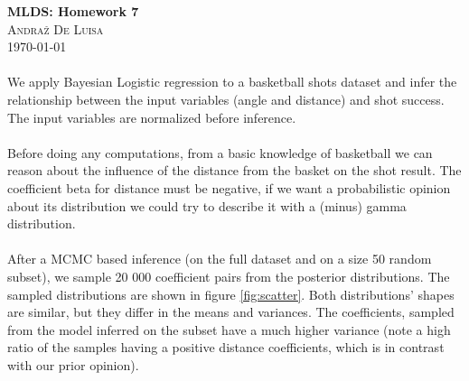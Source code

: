 \documentclass[twocolumn]{article}
\begin{document}
\begin{center}

\Large{\textbf{MLDS: Homework 7}} \\
\textsc{\large{Andraž De Luisa}} \\
\vspace{6pt}
\small{\today}

\end{center}

\paragraph{} We apply Bayesian Logistic regression to a basketball shots dataset and infer the relationship between the input variables (angle and distance) and shot success. The input variables are normalized before inference.

\paragraph{} Before doing any computations, from a basic knowledge of basketball we can reason about the influence of the distance from the basket on the shot result. The coefficient beta for distance must be negative, if we want a probabilistic opinion about its distribution we could try to describe it with a (minus) gamma distribution.

\paragraph{} After a MCMC based inference (on the full dataset and on a size 50 random subset), we sample 20 000 coefficient pairs from the posterior distributions. The sampled distributions are shown in figure \ref{fig:scatter}. Both distributions' shapes are similar, but they differ in the means and variances. The coefficients, sampled from the model inferred on the subset have a much higher variance (note a high ratio of the samples having a positive distance coefficients, which is in contrast with our prior opinion).
\end{document}
